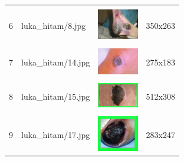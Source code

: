 \begin{table}[H]
\begin{tabular}{|m{0.2in}|m{1.2in}|m{0.7in}|m{0.7in}|}
		& &  &  \\
		6& 
		luka\_hitam/8.jpg &
		\includegraphics[width=0.7in]{gambar/dataset_citra/luka_hitam/bahan/8.jpg}&
		350x263\\
		\hline
		
		& &  &  \\
		7& 
		luka\_hitam/14.jpg &
		\includegraphics[width=0.7in]{gambar/dataset_citra/luka_hitam/bahan/14.jpg}&
		275x183\\
		\hline

		& &  &  \\
		8 & 
		luka\_hitam/15.jpg &
		\includegraphics[width=0.7in]{gambar/dataset_citra/luka_hitam/bahan/15.jpg}&
		512x308\\
		\hline
		
		& &  &  \\
		9 & 
		luka\_hitam/17.jpg &
		\includegraphics[width=0.7in]{gambar/dataset_citra/luka_hitam/bahan/17.jpg}&
		283x247\\
		\hline
	\end{tabular}
\end{table}


